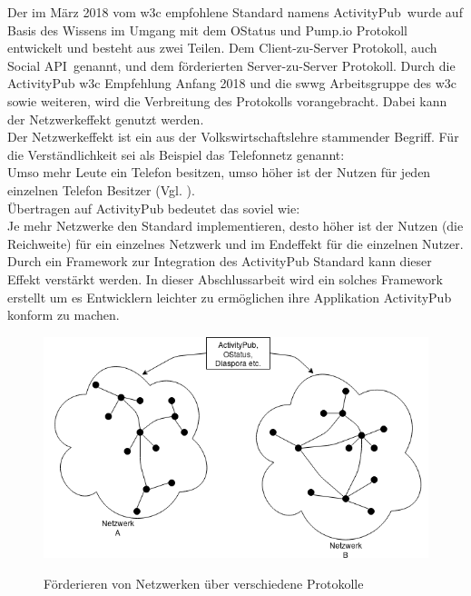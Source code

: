{	Der im März 2018 vom \gls{w3c} empfohlene Standard namens \glqq ActivityPub\grqq~wurde auf Basis des Wissens im Umgang mit dem OStatus und Pump.io Protokoll entwickelt und besteht aus zwei Teilen. Dem Client-zu-Server Protokoll, auch \glqq Social API\grqq~genannt, und dem förderierten Server-zu-Server Protokoll. Durch die ActivityPub \gls{w3c} Empfehlung Anfang 2018 und die \gls{swwg} Arbeitsgruppe des \gls{w3c} sowie weiteren, wird die Verbreitung des Protokolls vorangebracht. Dabei kann der Netzwerkeffekt genutzt werden.\\
	
	Der Netzwerkeffekt ist ein aus der Volkswirtschaftslehre stammender Begriff. Für die Verständlichkeit sei als Beispiel das Telefonnetz genannt:\\
	Umso mehr Leute ein Telefon besitzen, umso höher ist der Nutzen für jeden einzelnen Telefon Besitzer (Vgl. \cite{netzwerkeffekt}).\\
	Übertragen auf ActivityPub bedeutet das soviel wie:\\
	\glqq Je mehr Netzwerke den Standard implementieren, desto höher ist der Nutzen (die Reichweite) für ein einzelnes Netzwerk und im Endeffekt für die einzelnen Nutzer\grqq.\\
	
	Durch ein Framework zur Integration des ActivityPub Standard kann dieser Effekt verstärkt werden. In dieser Abschlussarbeit wird ein solches Framework erstellt um es Entwicklern leichter zu ermöglichen ihre Applikation ActivityPub konform zu machen.\\
	\begin{figure}[h]
		\begin{minipage}{\textwidth}
			\centering
			\includegraphics[scale=0.5]{figures/federate.png}
			\label{fig:federate1}
			\caption{Förderieren von Netzwerken über verschiedene Protokolle}
		\end{minipage}
	\end{figure}
	
}
